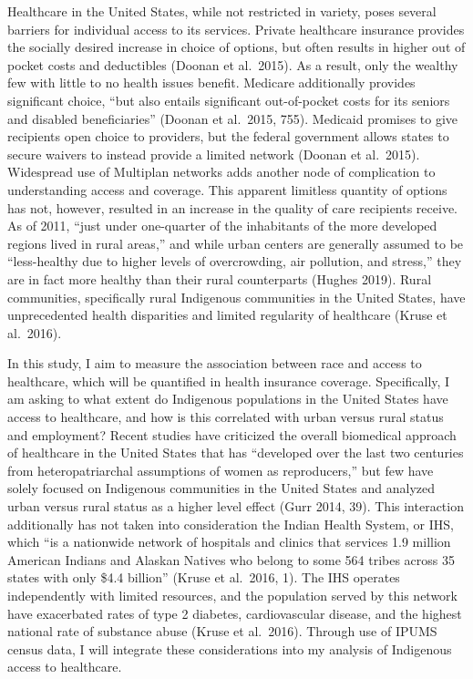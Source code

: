 \documentclass[11pt,]{article}
\begin{document}
Healthcare in the United States, while not restricted in variety, poses
several barriers for individual access to its services. Private
healthcare insurance provides the socially desired increase in choice of
options, but often results in higher out of pocket costs and deductibles
(Doonan et al.~2015). As a result, only the wealthy few with little to
no health issues benefit. Medicare additionally provides significant
choice, ``but also entails significant out-of-pocket costs for its
seniors and disabled beneficiaries'' (Doonan et al.~2015, 755). Medicaid
promises to give recipients open choice to providers, but the federal
government allows states to secure waivers to instead provide a limited
network (Doonan et al.~2015). Widespread use of Multiplan networks adds
another node of complication to understanding access and coverage. This
apparent limitless quantity of options has not, however, resulted in an
increase in the quality of care recipients receive. As of 2011, ``just
under one-quarter of the inhabitants of the more developed regions lived
in rural areas,'' and while urban centers are generally assumed to be
``less-healthy due to higher levels of overcrowding, air pollution, and
stress,'' they are in fact more healthy than their rural counterparts
(Hughes 2019). Rural communities, specifically rural Indigenous
communities in the United States, have unprecedented health disparities
and limited regularity of healthcare (Kruse et al.~2016).

In this study, I aim to measure the association between race and access
to healthcare, which will be quantified in health insurance coverage.
Specifically, I am asking to what extent do Indigenous populations in
the United States have access to healthcare, and how is this correlated
with urban versus rural status and employment? Recent studies have
criticized the overall biomedical approach of healthcare in the United
States that has ``developed over the last two centuries from
heteropatriarchal assumptions of women as reproducers,'' but few have
solely focused on Indigenous communities in the United States and
analyzed urban versus rural status as a higher level effect (Gurr 2014,
39). This interaction additionally has not taken into consideration the
Indian Health System, or IHS, which ``is a nationwide network of
hospitals and clinics that services 1.9 million American Indians and
Alaskan Natives who belong to some 564 tribes across 35 states with only
\$4.4 billion'' (Kruse et al.~2016, 1). The IHS operates independently
with limited resources, and the population served by this network have
exacerbated rates of type 2 diabetes, cardiovascular disease, and the
highest national rate of substance abuse (Kruse et al.~2016). Through
use of IPUMS census data, I will integrate these considerations into my
analysis of Indigenous access to healthcare.
\end{document}
